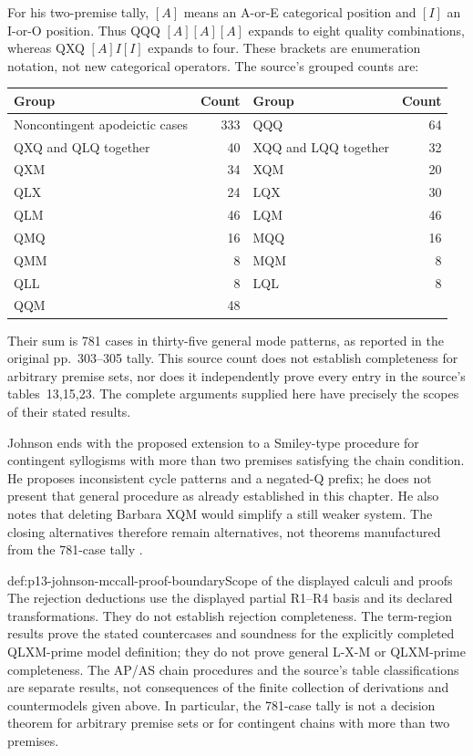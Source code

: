 For his two-premise tally, \([A]\) means an A-or-E categorical position and
\([I]\) an I-or-O position. Thus QQQ \([A][A][A]\) expands to eight
quality combinations, whereas QXQ \([A]I[I]\) expands to four. These brackets
are enumeration notation, not new categorical operators. The source's grouped
counts are:

\begin{tabularx}{\textwidth}{@{}X r X r@{}}
\toprule Group & Count & Group & Count\\\midrule
Noncontingent apodeictic cases &333& QQQ &64\\
QXQ and QLQ together &40& XQQ and LQQ together &32\\
QXM &34& XQM &20\\
QLX &24& LQX &30\\
QLM &46& LQM &46\\
QMQ &16& MQQ &16\\
QMM &8& MQM &8\\
QLL &8& LQL &8\\
QQM &48&&\\
\bottomrule
\end{tabularx}

Their sum is 781 cases in thirty-five general mode patterns, as reported in
the original pp.~303--305 tally. This source count does not establish
completeness for arbitrary premise sets, nor does it independently prove every
entry in the source's tables~13,15,23. The complete arguments supplied here
have precisely the scopes of their stated results.

Johnson ends with the proposed extension to a Smiley-type procedure for
contingent syllogisms with more than two premises satisfying the chain
condition. He proposes inconsistent cycle patterns and a negated-Q prefix;
he does not present that general procedure as already established in this
chapter. He also notes that deleting Barbara XQM would simplify a still
weaker system. The closing alternatives therefore remain alternatives, not
theorems manufactured from the 781-case tally
\parencite[pp.~305--306]{Johnson2004ModalSyllogisms}.

\begin{proofboundary}{def:p13-johnson-mccall-proof-boundary}{Scope of the displayed calculi and proofs}
The rejection deductions use the displayed partial R1--R4 basis and its
declared transformations. They do not establish rejection completeness.
The term-region results prove the stated countercases and soundness for
the explicitly completed QLXM-prime model definition; they do not prove
general L-X-M or QLXM-prime completeness. The AP/AS chain procedures and
the source's table classifications are separate results, not consequences
of the finite collection of derivations and countermodels given above.
In particular, the 781-case tally is not a decision theorem for arbitrary
premise sets or for contingent chains with more than two premises.
\end{proofboundary}
